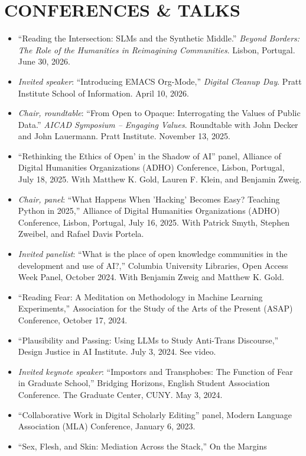 \documentclass[a4paper,11pt]{article}
\begin{document}
\section*{CONFERENCES \& TALKS}
\label{sec:org0f0b50d}
\begin{itemize}
\item ``Reading the Intersection: SLMs and the Synthetic Middle.'' \emph{Beyond
Borders: The Role of the Humanities in Reimagining Communities}.
Lisbon, Portugal. June 30, 2026.
\item \emph{Invited speaker}: ``Introducing EMACS Org-Mode,'' \emph{Digital Cleanup
Day}. Pratt Institute School of Information. April 10, 2026.
\item \emph{Chair, roundtable}: ``From Open to Opaque: Interrogating the Values
of Public Data.'' \emph{AICAD Symposium – Engaging Values}. Roundtable
with John Decker and John Lauermann. Pratt Institute. November
13, 2025.
\item ``Rethinking the Ethics of Open' in the Shadow of AI'' panel,
Alliance of Digital Humanities Organizations (ADHO) Conference,
Lisbon, Portugal, July 18, 2025. With Matthew K. Gold, Lauren F.
Klein, and Benjamin Zweig.
\item \emph{Chair, panel}: ``What Happens When 'Hacking' Becomes Easy? Teaching
Python in 2025,'' Alliance of Digital Humanities Organizations
(ADHO) Conference, Lisbon, Portugal, July 16, 2025. With Patrick
Smyth, Stephen Zweibel, and Rafael Davis Portela.
\item \emph{Invited panelist}: ``What is the place of open knowledge
communities in the development and use of AI?,'' Columbia University
Libraries, Open Access Week Panel, October 2024. With Benjamin Zweig
and Matthew K. Gold.
\item ``Reading Fear: A Meditation on Methodology in Machine Learning
Experiments,'' Association for the Study of the Arts of the Present
(ASAP) Conference, October 17, 2024.
\item ``Plausibility and Passing: Using LLMs to Study Anti-Trans
Discourse,'' Design Justice in AI Institute. July 3, 2024. See
video.
\item \emph{Invited keynote speaker}: ``Impostors and Transphobes: The Function
of Fear in Graduate School,'' Bridging Horizons, English Student
Association Conference. The Graduate Center, CUNY. May 3, 2024.
\item ``Collaborative Work in Digital Scholarly Editing'' panel, Modern
Language Association (MLA) Conference, January 6, 2023.
\item ``Sex, Flesh, and Skin: Mediation Across the Stack,'' On the Margins

\end{itemize}
\end{document}

